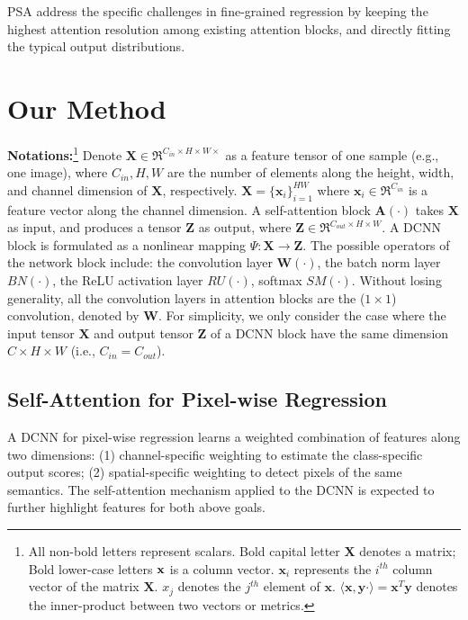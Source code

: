 \documentclass[10pt,twocolumn,letterpaper]{article}
\newcommand{\x}{\mathbf{x}}
\newcommand{\X}{\mathbf{X}}
\newcommand{\y}{\mathbf{y}}
\newcommand{\Z}{\mathbf{Z}}
\newcommand{\A}{\mathbf{A}}
\newcommand{\W}{\mathbf{W}}
\begin{document}
PSA address the specific challenges in fine-grained regression by keeping the highest attention resolution among existing attention blocks, and directly fitting the typical output distributions.


 
 \section{Our Method}
\textbf{Notations:}\footnote{All non-bold letters represent scalars. Bold capital letter $\X$ denotes a matrix; Bold lower-case letters $\bf{x}$ is a column vector. $\x_i$ represents the $i^{th}$ column vector of the matrix $\X$. $x_{j}$ denotes the $j^{th}$ element of $\x$.  $\langle \x, \y \cdot\rangle= \x^{T}\y$ denotes the inner-product between two vectors or metrics.}  Denote $\X \in \Re^{C_{in}\times H\times W \times}$
  as a feature tensor of one sample (e.g., one image), where $C_{in},H,W$ are the number of elements along the height, width, and channel dimension of $\X$, respectively.  
 $\X= \{\x_{i}\}_{i=1}^{HW}$ where $\x_{i}\in \Re^{C_{in}}$ is a feature vector along the channel dimension.  
 A  self-attention block $\A(\cdot)$ takes $\X$ as input, and produces a tensor $\Z$ as output, where $\Z\in \Re^{C_{out}\times H\times W }$. A DCNN block is formulated as a nonlinear mapping $\Psi:\X \rightarrow \Z$. The possible operators of the network block include: the convolution layer $\W(\cdot)$, the batch norm  layer $BN(\cdot)$, the ReLU activation layer $RU(\cdot)$, softmax $SM(\cdot)$. Without losing generality, all the convolution layers in attention blocks are the ($1\times 1$) convolution, denoted by $\W$.  For simplicity, we only consider the case where the input tensor $\X$ and output tensor $\Z$ of a DCNN block have the same dimension $C\times H \times W$  (i.e., $C_{in}=C_{out}$).

\subsection{Self-Attention for Pixel-wise Regression}

A DCNN for pixel-wise regression learns a weighted combination of features along two dimensions: (1) channel-specific weighting to estimate the class-specific output scores; (2) spatial-specific weighting to detect pixels of the same semantics. The self-attention mechanism applied to the DCNN is expected to further highlight features for both above goals. 
\end{document}

